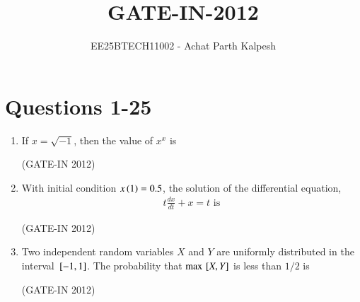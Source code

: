 \documentclass[journal,12pt,onecolumn]{IEEEtran}
\title{GATE-IN-2012}
\author{EE25BTECH11002 - Achat Parth Kalpesh}
\date{}
\theoremstyle{remark}
\begin{document}
\maketitle

\section*{Questions 1-25 }
\begin{enumerate}
\item If $x = \sqrt{-1}$, then the value of $x^x$ is

\hfill{(GATE-IN 2012)}
\begin{enumerate}
\end{enumerate}

\item With initial condition $x\left(1\right) = 0.5$, the solution of the differential equation,
\begin{align*}
t\frac{dx}{dt} + x = t\text{ is}
\end{align*}

\hfill{(GATE-IN 2012)}
\begin{enumerate}
\end{enumerate}

\item Two independent random variables $X$ and $Y$ are uniformly distributed in the interval ${}\left[-1, 1\right]$. The probability that $\max{}\left[X, Y\right]$ is less than $1/2$ is

\hfill{(GATE-IN 2012)}
\begin{enumerate}
\end{enumerate}


\end{enumerate}
\end{document}
